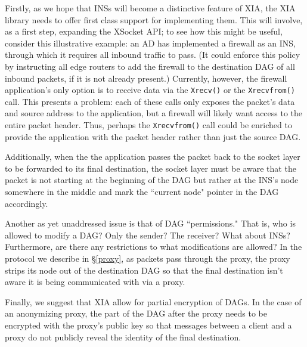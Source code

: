 \documentclass{article}
\newcommand{\entrynode}[1]{
  \SetVertexNormal[Shape      = circle,
                   FillColor  = black,
                   LineWidth  = 0pt,
                   MinSize    = 0pt]
  \Vertex[L={\tiny\,}]{#1}
  \SetVertexNormal[Shape      = circle,
                   FillColor  = white,
                   LineWidth  = 2pt]
}
\newcommand{\encryptednode}[2]{
  \SetVertexNormal[Shape      = circle,
                   FillColor  = white,
                   LineWidth  = 2pt]
  \tikzstyle{VertexStyle}=[dotted, draw, circle]
  \Vertex[#1]{#2}
  \SetVertexNormal[Shape      = circle,
                   FillColor  = white,
                   LineWidth  = 2pt]
}
\begin{document}
Firstly, as we hope that INSs will become a distinctive feature of XIA, the XIA library needs to offer first class support for implementing them. This will involve, as a first step, expanding the XSocket API; to see how this might be useful, consider this illustrative example: an AD has implemented a firewall as an INS, through which it requires all inbound traffic to pass. (It could enforce this policy by instructing all edge routers to add the firewall to the destination DAG of all inbound packets, if it is not already present.) Currently, however, the firewall application's only option is to receive data via the \texttt{Xrecv()} or the \texttt{Xrecvfrom()} call. This presents a problem: each of these calls only exposes the packet's data and source address to the application, but a firewall will likely want access to the entire packet header. Thus, perhaps the \texttt{Xrecvfrom()} call could be enriched to provide the application with the packet header rather than just the source DAG. 

Additionally, when the the application passes the packet back to the socket layer to be forwarded to its final destination, the socket layer must be aware that the packet is not starting at the beginning of the DAG but rather at the INS's node somewhere in the middle and mark the ``current node" pointer in the DAG accordingly.

Another as yet unaddressed issue is that of DAG ``permissions." That is, who is allowed to modify a DAG? Only the sender? The receiver? What about INSs? Furthermore, are there any restrictions to what modifications are allowed? In the protocol we describe in \S\ref{proxy}, as packets pass through the proxy, the proxy strips its node out of the destination DAG so that the final destination isn't aware it is being communicated with via a proxy.

Finally, we suggest that XIA allow for partial encryption of DAGs.  In the case of an anonymizing proxy, the part of the DAG after the proxy needs to be encrypted with the proxy's public key so that messages between a client and a proxy do not publicly reveal the identity of the final destination.

\begin{center}
\end{center}
\end{document}
